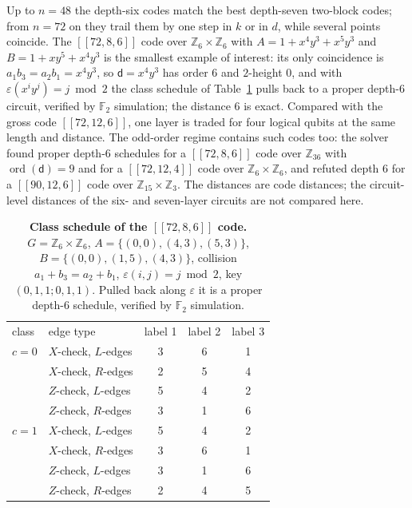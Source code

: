 \documentclass[reprint,twocolumn,superscriptaddress,nofootinbib]{revtex4-2}
\theoremstyle{plain}
\newcommand{\F}{\mathbb{F}_2}
\newcommand{\col}{\mathsf{d}}          %
\begin{document}
Up to $n=48$ the depth-six codes match the best depth-seven two-block
codes; from $n=72$ on they trail them by one step in $k$ or in $d$, while
several points coincide. The $[[72,8,6]]$ code over
$\mathbb{Z}_6\times\mathbb{Z}_6$ with $A=1+x^4y^3+x^5y^3$ and
$B=1+xy^5+x^4y^3$ is the smallest example of interest: its only
coincidence is $a_1b_3=a_2b_1=x^4y^3$, so $\col=x^4y^3$ has order $6$ and
$2$-height $0$, and with $\varepsilon(x^iy^j)=j\bmod2$ the class schedule of
Table~\ref{tab:template72} pulls back to a proper depth-$6$ circuit,
verified by $\F$ simulation; the distance $6$ is exact. Compared with the
gross code $[[72,12,6]]$, one layer is traded for four logical qubits at
the same length and distance. The odd-order regime contains such codes
too: the solver found proper depth-$6$ schedules for a $[[72,8,6]]$ code
over $\mathbb{Z}_{36}$ with $\operatorname{ord}(\col)=9$ and for a
$[[72,12,4]]$ code over $\mathbb{Z}_6\times\mathbb{Z}_6$, and refuted depth
$6$ for a $[[90,12,6]]$ code over $\mathbb{Z}_{15}\times\mathbb{Z}_3$.
The distances are code distances; the circuit-level distances of the six-
and seven-layer circuits are not compared here.

\begin{table}[t]
\caption{\textbf{Class schedule of the $[[72,8,6]]$ code.}
$G=\mathbb{Z}_6\times\mathbb{Z}_6$, $A=\{(0,0),(4,3),(5,3)\}$,
$B=\{(0,0),(1,5),(4,3)\}$, collision $a_1+b_3=a_2+b_1$,
$\varepsilon(i,j)=j\bmod2$, key $(0,1,1;0,1,1)$. Pulled back along
$\varepsilon$ it is a proper depth-$6$ schedule, verified by $\F$
simulation.}
\label{tab:template72}
\begin{ruledtabular}
\begin{tabular}{llccc}
class & edge type & label 1 & label 2 & label 3 \\
\colrule
$c=0$ & $X$-check, $L$-edges & 3 & 6 & 1 \\
      & $X$-check, $R$-edges & 2 & 5 & 4 \\
      & $Z$-check, $L$-edges & 5 & 4 & 2 \\
      & $Z$-check, $R$-edges & 3 & 1 & 6 \\
\colrule
$c=1$ & $X$-check, $L$-edges & 5 & 4 & 2 \\
      & $X$-check, $R$-edges & 3 & 6 & 1 \\
      & $Z$-check, $L$-edges & 3 & 1 & 6 \\
      & $Z$-check, $R$-edges & 2 & 4 & 5 \\
\end{tabular}
\end{ruledtabular}
\end{table}
\end{document}
